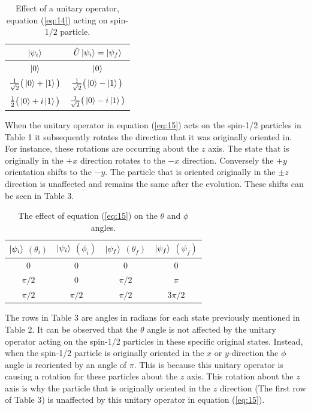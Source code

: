 \documentclass[twocolumn]{article}
\begin{document}
\begin{table}[h!]
\begin{center}
\begin{tabular}{ |c|c| }
\hline $\ket{\psi_i}$& $\hat{U}\ket{\psi_i}=\ket{\psi_f}$ \\
\hline $\ket{0}$& $\ket{0}$\\
\hline $\frac{1}{\sqrt{2}}\big(\ket{0}+\ket{1}\big)$& $\frac{1}{\sqrt{2}}\big(\ket{0}-\ket{1}\big)$\\
\hline $\frac{1}{2}\big(\ket{0}+i\ket{1}\big)$& $\frac{1}{\sqrt{2}}\big(\ket{0}-i\ket{1}\big)$\\
\hline
\end{tabular}
\caption{Effect of a unitary operator, equation (\ref{eq:14}) acting on spin-$1/2$ particle.}
\end{center}
\end{table}
\newline 
When the unitary operator in equation (\ref{eq:15}) acts on the spin-1/2 particles in Table 1 it subsequently rotates the direction that it was originally oriented in. For instance, these rotations are occurring about the $z$ axis. The state that is originally in the $+x$ direction rotates to the $-x$ direction. Conversely the $+y$ orientation shifts to the $-y$. The particle that is oriented originally in the $\pm z$ direction is unaffected and remains the same after the evolution. These shifts can be seen in Table 3.
\begin{table}[h!]
\begin{center}
\begin{tabular}{ |c|c|c|c| }
\hline $\ket{\psi_i}$ $(\theta_i)$& $\ket{\psi_i}$ $(\phi_i)$& $\ket{\psi_f}$ $(\theta_f)$& $\ket{\psi_f}$ $(\psi_f)$ \\
\hline 0 & 0 & 0 & 0 \\
\hline $\pi/2$ & 0 & $\pi/2$ & $\pi$ \\
\hline $\pi/2$ & $\pi/2$ & $\pi/2$ & $3\pi/2$ \\
\hline
\end{tabular}
\caption{The effect of equation (\ref{eq:15}) on the $\theta$ and $\phi$ angles.}
\end{center}
\end{table}
\newline
The rows in Table 3 are angles in radians for each state previously mentioned in Table 2. It can be observed that the $\theta$ angle is not affected by the unitary operator acting on the spin-1/2 particles in these specific original states. Instead, when the spin-1/2 particle is originally oriented in the $x$ or $y$-direction the $\phi$ angle is reoriented by an angle of $\pi$. This is because this unitary operator is causing a rotation for these particles about the $z$ axis. This rotation about the $z$ axis is why the particle that is originally oriented in the $z$ direction (The first row of Table 3) is unaffected by this unitary operator in equation (\ref{eq:15}).
\end{document}
